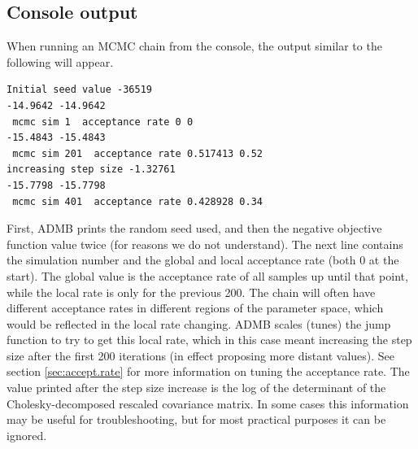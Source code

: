 \documentclass{article}\usepackage[]{graphicx}\usepackage[]{color}
\begin{document}
\subsection{Console output}
When running an MCMC chain from the console, the output
similar to the following will appear.
\begin{verbatim}
Initial seed value -36519
-14.9642 -14.9642
 mcmc sim 1  acceptance rate 0 0
-15.4843 -15.4843
 mcmc sim 201  acceptance rate 0.517413 0.52
increasing step size -1.32761
-15.7798 -15.7798
 mcmc sim 401  acceptance rate 0.428928 0.34
\end{verbatim}
First, ADMB prints the random seed used, and then the
negative objective function value twice (for reasons we do
not understand). The next line contains the simulation
number and the global and local acceptance rate (both 0 at
the start). The global value is the acceptance rate of all
samples up until that point, while the local rate is only
for the previous 200. The chain will often have different
acceptance rates in different regions of the parameter
space, which would be reflected in the local rate
changing. ADMB scales (tunes) the jump function to try to
get this local rate, which in this case meant increasing the
step size after the first 200 iterations (in effect
proposing more distant values). See section
\ref{sec:accept.rate} for more information on tuning the
acceptance rate. The value printed after the step size
increase is the log of the determinant of the
Cholesky-decomposed rescaled covariance matrix. In some
cases this information may be useful for troubleshooting,
but for most practical purposes it can be ignored.
\end{document}

